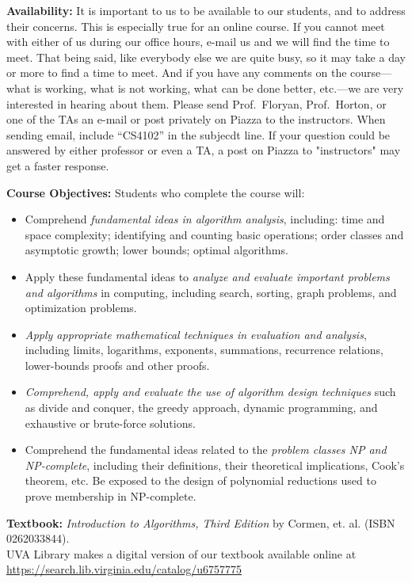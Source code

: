 \documentclass[12pt]{article}
\begin{document}
\textbf{Availability:} It is important to us to be available to our students, and to address their concerns. This is especially true for an online course. If you cannot meet with either of us during our office hours, e-mail us and we will find the time to meet. That being said, like everybody else we are quite busy, so it may take a day or more to find a time to meet. And if you have any comments on the course---what is working, what is not working, what can be done better, etc.---we are very interested in hearing about them.  Please send Prof.\ Floryan, Prof.\ Horton, or one of the TAs an e-mail or post privately on Piazza to the instructors.  When sending email, include ``CS4102'' in the subjecdt line. If your question could be answered by either professor or even a TA, a post on Piazza to "instructors" may get a faster response.


\textbf{Course Objectives:} Students who complete the course will:
\begin{itemize}
    \item Comprehend \textit{fundamental ideas in algorithm analysis}, including: time and space complexity; identifying and counting basic operations; order classes and asymptotic growth; lower bounds; optimal algorithms. 
    \item Apply these fundamental ideas to \textit{analyze and evaluate important problems and algorithms} in computing, including search, sorting, graph problems, and optimization problems.
    \item \textit{Apply appropriate mathematical techniques in evaluation and analysis}, including limits, logarithms, exponents, summations, recurrence relations, lower-bounds proofs and other proofs.
    \item \textit{Comprehend, apply and evaluate the use of algorithm design techniques} such as divide and conquer, the greedy approach, dynamic programming, and exhaustive or brute-force solutions.
    \item Comprehend the fundamental ideas related to the \textit{problem classes NP and NP-complete}, including their definitions, their theoretical implications, Cook's theorem, etc. Be exposed to the design of polynomial reductions used to prove membership in NP-complete.
\end{itemize}

\textbf{Textbook:} \textit{Introduction to Algorithms, Third Edition} by Cormen, et. al. (ISBN 0262033844).\\
UVA Library makes a digital version of our textbook available online at\\\url{https://search.lib.virginia.edu/catalog/u6757775}\\
\end{document}
